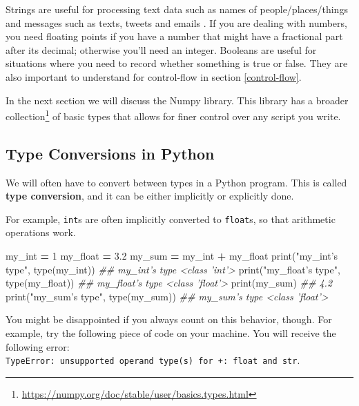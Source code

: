 \documentclass[12pt,krantz2]{krantz}
\makeatletter
\newenvironment{Shaded}{\begin{snugshade}}{\end{snugshade}}
\newcommand{\BuiltInTok}[1]{#1}
\newcommand{\CommentTok}[1]{\textcolor[rgb]{0.37,0.37,0.37}{\textit{#1}}}
\newcommand{\DecValTok}[1]{\textcolor[rgb]{0.06,0.06,0.06}{#1}}
\newcommand{\FloatTok}[1]{\textcolor[rgb]{0.06,0.06,0.06}{#1}}
\newcommand{\NormalTok}[1]{#1}
\newcommand{\OperatorTok}[1]{\textcolor[rgb]{0.43,0.43,0.43}{\textbf{#1}}}
\newcommand{\StringTok}[1]{\textcolor[rgb]{0.5,0.5,0.5}{#1}}
\renewcommand{\href}[2]{#2\footnote{\url{#1}}}
\newenvironment{kframe}{%
\medskip{}
\setlength{\fboxsep}{.8em}
 \def\at@end@of@kframe{}%
 \ifinner\ifhmode%
  \def\at@end@of@kframe{\end{minipage}}%
  \begin{minipage}{\columnwidth}%
 \fi\fi%
 \def\FrameCommand##1{\hskip\@totalleftmargin \hskip-\fboxsep
 \colorbox{shadecolor}{##1}\hskip-\fboxsep
     \hskip-\linewidth \hskip-\@totalleftmargin \hskip\columnwidth}%
 \MakeFramed {\advance\hsize-\width
   \@totalleftmargin\z@ \linewidth\hsize
   \@setminipage}}%
 {\par\unskip\endMakeFramed%
 \at@end@of@kframe}
\renewenvironment{Shaded}{\begin{kframe}}{\end{kframe}}
\makeatother
\begin{document}
Strings are useful for processing text data such as names of people/places/things and messages such as texts, tweets and emails \citep{python_cookbook}. If you are dealing with numbers, you need floating points if you have a number that might have a fractional part after its decimal; otherwise you'll need an integer. Booleans are useful for situations where you need to record whether something is true or false. They are also important to understand for control-flow in section \ref{control-flow}.

In the next section we will discuss the Numpy library. This library has a \href{https://numpy.org/doc/stable/user/basics.types.html}{broader collection} of basic types that allows for finer control over any script you write.

\hypertarget{type-conversions-in-python}{%
\subsection{Type Conversions in Python}\label{type-conversions-in-python}}

We will often have to convert between types in a Python program. This is called \textbf{type conversion}, and it can be either implicitly or explicitly done.

For example, \texttt{int}s are often implicitly converted to \texttt{float}s, so that arithmetic operations work.

\begin{Shaded}
\begin{Highlighting}[]
\NormalTok{my_int }\OperatorTok{=} \DecValTok{1}
\NormalTok{my_float }\OperatorTok{=} \FloatTok{3.2}
\NormalTok{my_sum }\OperatorTok{=}\NormalTok{ my_int }\OperatorTok{+}\NormalTok{ my_float}
\BuiltInTok{print}\NormalTok{(}\StringTok{"my_int's type"}\NormalTok{, }\BuiltInTok{type}\NormalTok{(my_int))}
\CommentTok{## my_int's type <class 'int'>}
\BuiltInTok{print}\NormalTok{(}\StringTok{"my_float's type"}\NormalTok{, }\BuiltInTok{type}\NormalTok{(my_float))}
\CommentTok{## my_float's type <class 'float'>}
\BuiltInTok{print}\NormalTok{(my_sum)}
\CommentTok{## 4.2}
\BuiltInTok{print}\NormalTok{(}\StringTok{"my_sum's type"}\NormalTok{, }\BuiltInTok{type}\NormalTok{(my_sum))}
\CommentTok{## my_sum's type <class 'float'>}
\end{Highlighting}
\end{Shaded}

You might be disappointed if you always count on this behavior, though. For example, try the following piece of code on your machine. You will receive the following error: \texttt{TypeError:\ unsupported\ operand\ type(s)\ for\ +:\ \textquotesingle{}float\textquotesingle{}\ and\ \textquotesingle{}str\textquotesingle{}}.
\end{document}
